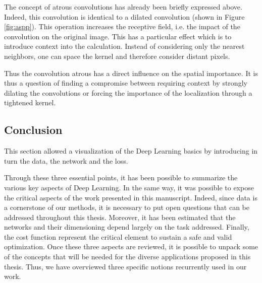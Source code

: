 The concept of atrous convolutions has already been briefly expressed above. Indeed, this convolution is identical to a dilated convolution (shown in Figure \ref{fig:aspp}). This operation increases the receptive field, i.e. the impact of the convolution on the original image. This has a particular effect which is to introduce context into the calculation. Instead of considering only the nearest neighbors, one can space the kernel and therefore consider distant pixels.

Thus the convolution atrous has a direct influence on the spatial importance. It is thus a question of finding a compromise between requiring context by strongly dilating the convolutions or forcing the importance of the localization through a tightened kernel.  

\subsection{Conclusion}
This section allowed a visualization of the Deep Learning basics by introducing in turn the data, the network and the loss. 

Through these three essential points, it has been possible to summarize the various key aspects of Deep Learning. In the same way, it was possible to expose the critical aspects of the work presented in this manuscript.
Indeed, since data is a cornerstone of our methods, it is necessary to put open questions that can be addressed throughout this thesis.
Moreover, it has been estimated that the networks and their dimensioning depend largely on the task addressed. 
Finally, the cost function represent the critical element to sustain a safe and valid optimization.
Once these three aspects are reviewed, it is possible to unpack some of the concepts that will be needed for the diverse applications proposed in this thesis. Thus, we have overviewed three specific notions recurrently used in our work. 




